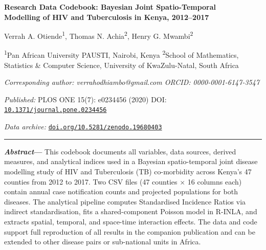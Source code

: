 \documentclass[11pt,a4paper]{article}
\begin{document}
\setlength{\parindent}{1em}
\setlength{\parskip}{4pt}

\begin{center}
{\Large\bfseries
  Research Data Codebook: Bayesian Joint Spatio-Temporal\\
  Modelling of HIV and Tuberculosis in Kenya, 2012--2017}

\vspace{10pt}
{\normalsize
  Verrah A. Otiende\textsuperscript{1},\;
  Thomas N. Achia\textsuperscript{2},\;
  Henry G. Mwambi\textsuperscript{2}}

\vspace{4pt}
{\small
  \textsuperscript{1}Pan African University PAUSTI, Nairobi, Kenya\quad
  \textsuperscript{2}School of Mathematics, Statistics \& Computer Science,
  University of KwaZulu-Natal, South Africa}

\vspace{4pt}
{\small\itshape
  Corresponding author: verrahodhiambo@gmail.com\quad
  ORCID: 0000-0001-6147-3547}

\vspace{6pt}
{\small
  \textit{Published:} PLOS ONE 15(7): e0234456 (2020)\quad
  DOI: \href{https://doi.org/10.1371/journal.pone.0234456}%
  {\texttt{10.1371/journal.pone.0234456}}}

\vspace{2pt}
{\small
  \textit{Data archive:}
  \href{https://doi.org/10.5281/zenodo.19680403}%
  {\texttt{doi.org/10.5281/zenodo.19680403}}}
\end{center}

\vspace{8pt}\hrule\vspace{6pt}

\small\noindent\textbf{\textit{Abstract}---}%
This codebook documents all variables, data sources, derived measures, and
analytical indices used in a Bayesian spatio-temporal joint disease modelling
study of HIV and Tuberculosis (TB) co-morbidity across Kenya's 47 counties
from 2012 to 2017. Two CSV files (47 counties $\times$ 16 columns each) contain
annual case notification counts and projected populations for both diseases. The
analytical pipeline computes Standardised Incidence Ratios via indirect
standardisation, fits a shared-component Poisson model in R-INLA, and extracts
spatial, temporal, and space-time interaction effects. The data and code support
full reproduction of all results in the companion publication and can be extended
to other disease pairs or sub-national units in Africa.
\end{document}
